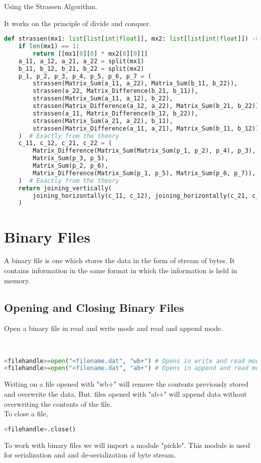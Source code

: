 \begin{eg}
	Using the Strassen Algorithm.
\end{eg}
\begin{explanation}
	It works on the principle of divide and conquer.
	\begin{lstlisting}[language=Python, numbers=none]
def strassen(mx1: list[list[int|float]], mx2: list[list[int|float]]) -> list[list[int|float]]:
	if len(mx1) == 1:
		return [[mx1[0][0] * mx2[0][0]]]
	a_11, a_12, a_21, a_22 = split(mx1)
	b_11, b_12, b_21, b_22 = split(mx2)
	p_1, p_2, p_3, p_4, p_5, p_6, p_7 = (
		strassen(Matrix_Sum(a_11, a_22), Matrix_Sum(b_11, b_22)),
		strassen(a_22, Matrix_Difference(b_21, b_11)),
		strassen(Matrix_Sum(a_11, a_12), b_22),
		strassen(Matrix_Difference(a_12, a_22), Matrix_Sum(b_21, b_22)),
		strassen(a_11, Matrix_Difference(b_12, b_22)),
		strassen(Matrix_Sum(a_21, a_22), b_11),
		strassen(Matrix_Difference(a_11, a_21), Matrix_Sum(b_11, b_12)),
	)  # Exactly from the theory
	c_11, c_12, c_21, c_22 = (
		Matrix_Difference(Matrix_Sum(Matrix_Sum(p_1, p_2), p_4), p_3),
		Matrix_Sum(p_3, p_5),
		Matrix_Sum(p_2, p_6),
		Matrix_Difference(Matrix_Sum(p_1, p_5), Matrix_Sum(p_6, p_7)),
	)  # Exactly from the theory
	return joining_vertically(
		joining_horizontally(c_11, c_12), joining_horizontally(c_21, c_22)
	) \end{lstlisting}
\end{explanation}

\section{Binary Files}
A binary file is one which stores the data in the form of stream of bytes. It contains information in the same format in which the information is held in memory.
\subsection{Opening and Closing Binary Files}
\begin{eg}
	Open a binary file in read and write mode and read and append mode.
\end{eg}
\begin{explanation} \phantom{}\\
	\begin{lstlisting}[language=Python]
<filehandle>=open("<filename.dat", "wb+") # Opens in write and read mode
<filehandle>=open("<filename.dat", "ab+") # Opens in append and read mode \end{lstlisting}
	Writing on a file opened with "wb+" will remove the contents previously stored and overwrite the data. But. files opened with "ab+" will append data without overwriting the contents of the file.\\
	To close a file,
	\begin{lstlisting}[language=Python]
<filehandle>.close()\end{lstlisting}
\end{explanation}
To work with binary files we will import a module "pickle". This module is used for serialization and and de-serialization of byte stream.
